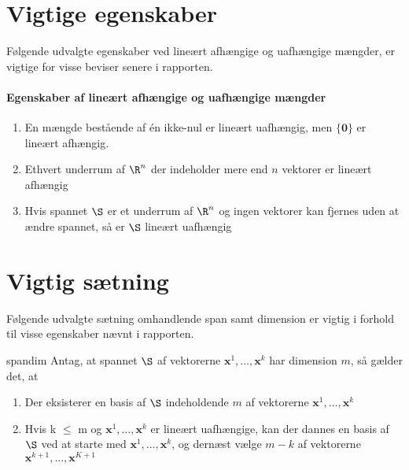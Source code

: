 \chapter{Vigtige egenskaber}
%
Følgende udvalgte egenskaber ved lineært afhængige og uafhængige mængder, er vigtige for visse beviser senere i rapporten.
\subsubsection{Egenskaber af lineært afhængige og uafhængige mængder}\label{egenskab_lin}
\begin{enumerate}
\item En mængde bestående af én ikke-nul er lineært uafhængig, men $\{\textbf{0}\}$ er lineært afhængig.
\item Ethvert underrum af $\R^n$ der indeholder mere end $n$ vektorer er lineært afhængig
\item Hvis spannet $\S$ er et underrum af $\R^n$ og ingen vektorer kan fjernes uden at ændre spannet, så er $\S$ lineært uafhængig
\end{enumerate}


\chapter{Vigtig sætning}
%
Følgende udvalgte sætning omhandlende span samt dimension er vigtig i forhold til visse egenskaber nævnt i rapporten.
\begin{thm}{}{spandim}
Antag, at spannet $\S$ af vektorerne $\mathbf{x}^1,\ldots,\mathbf{x}^k$ har dimension $m$, så gælder det, at 
\begin{enumerate}[label=(\alph*)]
    \item Der eksisterer en basis af $\S$ indeholdende $m$ af vektorerne $\mathbf{x}^1,\ldots,\mathbf{x}^k$
    \item Hvis k $\leq$ m og $\mathbf{x}^1,\ldots,\mathbf{x}^k$ er lineært uafhængige, kan der dannes en basis af $\S$ ved at starte med $\mathbf{x}^1,\ldots,\mathbf{x}^k$, og dernæst vælge $m-k$ af vektorerne $\mathbf{x}^{k+1},\ldots,\mathbf{x}^{K+1}$
\end{enumerate}
\end{thm}{}